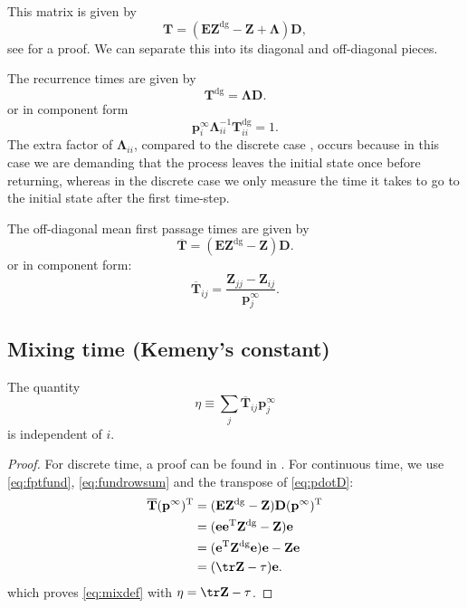 \documentclass{article} %
\newcommand{\inv}{^{-1}}
\newcommand{\dg}{^\mathrm{dg}}
\newcommand{\trans}{^\mathrm{T}}
\newcommand{\onev}{\mathbf{e}}
\newcommand{\onem}{\mathbf{E}}
\newcommand{\pr}{\mathbf{p}}
\newcommand{\eq}{\pr^\infty}
\newcommand{\fpt}{\mathbf{T}}
\newcommand{\fptb}{\overline{\fpt}}
\newcommand{\fund}{\mathbf{Z}}
\newcommand{\D}{\mathbf{D}}
\newcommand{\Lb}{\boldsymbol{\Lambda}}
\begin{document}
This matrix is given by
%
\begin{equation}\label{eq:fpt}
  \fpt=(\onem\fund\dg - \fund + \Lb)\D,
\end{equation}
%
see \cite{Yao1985fpt} for a proof.
We can separate this into its diagonal and off-diagonal pieces.

The recurrence times are given by
%
\begin{equation}\label{eq:recurtime}
  \fpt\dg = \Lb\D.
\end{equation}
%
or in component form
%
\begin{equation*}
  \eq_i \Lb_{ii}\inv \fpt\dg_{ii} = 1.
\end{equation*}
%
The extra factor of $\Lb_{ii}$, compared to the discrete case \cite[Th.4.4.5]{kemeny1960finite}, occurs because in this case we are demanding that the process leaves the initial state once before returning, whereas in the discrete case we only measure the time it takes to go to the initial state after the first time-step.

The off-diagonal mean first passage times are given by
%
\begin{equation}\label{eq:fptfund}
  \fptb = (\onem\fund\dg - \fund)\D.
\end{equation}
%
or in component form:
%
\begin{equation}\label{eq:fptfundcmpt}
  \fptb_{ij} = \frac{\fund_{jj}-\fund_{ij}}{\eq_j}.
\end{equation}
%

\subsection{Mixing time (Kemeny's constant)}\label{sec:mixtime}

\begin{thm} \mbox{}\label{th:kemenyconst}
  The quantity
  \begin{equation}\label{eq:mixdef}
    \eta \equiv \sum_j \fptb_{ij}\eq_j
  \end{equation}
  is independent of $i$.
\end{thm}
\begin{proof}
  For discrete time, a proof can be found in \cite[Th.4.4.10]{kemeny1960finite}.
  For continuous time, we use \eqref{eq:fptfund}, \eqref{eq:fundrowsum} and the transpose of \eqref{eq:pdotD}:
  \begin{equation*}
    \begin{aligned}
      \fptb (\eq)\trans &= (\onem\fund\dg - \fund) \D (\eq)\trans \\
        &= (\onev\onev\trans\fund\dg - \fund) \onev \\
        &= (\onev\trans\fund\dg\onev)\onev - \fund\onev \\
        &= (\tr\fund - \tau)\onev.
    \end{aligned}
  \end{equation*}
  which proves \eqref{eq:mixdef} with $\eta = \tr\fund - \tau$.
\end{proof}
\end{document}
